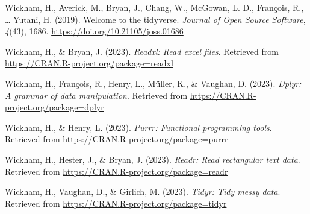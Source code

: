 \documentclass[
  man]{apa6}
\newlength{\cslhangindent}
\newlength{\cslentryspacingunit} %
\newenvironment{CSLReferences}[2] %
 {%
  \setlength{\parindent}{0pt}
  \ifodd #1
  \let\oldpar\par
  \def\par{\hangindent=\cslhangindent\oldpar}
  \fi
  \setlength{\parskip}{#2\cslentryspacingunit}
 }%
 {}
\begin{document}
\begin{CSLReferences}{1}{0}
\leavevmode{}%
Wickham, H., Averick, M., Bryan, J., Chang, W., McGowan, L. D., François, R., \ldots{} Yutani, H. (2019). Welcome to the {tidyverse}. \emph{Journal of Open Source Software}, \emph{4}(43), 1686. \url{https://doi.org/10.21105/joss.01686}

\leavevmode{}%
Wickham, H., \& Bryan, J. (2023). \emph{Readxl: Read excel files}. Retrieved from \url{https://CRAN.R-project.org/package=readxl}

\leavevmode{}%
Wickham, H., François, R., Henry, L., Müller, K., \& Vaughan, D. (2023). \emph{Dplyr: A grammar of data manipulation}. Retrieved from \url{https://CRAN.R-project.org/package=dplyr}

\leavevmode{}%
Wickham, H., \& Henry, L. (2023). \emph{Purrr: Functional programming tools}. Retrieved from \url{https://CRAN.R-project.org/package=purrr}

\leavevmode{}%
Wickham, H., Hester, J., \& Bryan, J. (2023). \emph{Readr: Read rectangular text data}. Retrieved from \url{https://CRAN.R-project.org/package=readr}

\leavevmode{}%
Wickham, H., Vaughan, D., \& Girlich, M. (2023). \emph{Tidyr: Tidy messy data}. Retrieved from \url{https://CRAN.R-project.org/package=tidyr}

\end{CSLReferences}
\end{document}
